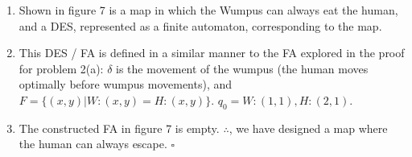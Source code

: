\documentclass[12pt,letterpaper]{ntdhw}
\begin{document}
\begin{enumerate}
    \begin{enumerate}
        \item Shown in figure 7 is a map in which the Wumpus can always eat the human, and a DES, represented as a finite automaton, corresponding to the map. 
        \item This DES / FA is defined in a similar manner to the FA explored in the proof for problem 2(a): $\delta$ is the movement of the wumpus (the human moves optimally before wumpus movements), and $F = \{(x,y)|W:(x,y) = H:(x,y)\}$. $q_0 = W:(1,1), H:(2,1)$. 
        \item The constructed FA in figure 7 is empty. $\therefore$, we have designed a map where the human can always escape. $\square$
    \end{enumerate}

\end{enumerate}
\end{document}
